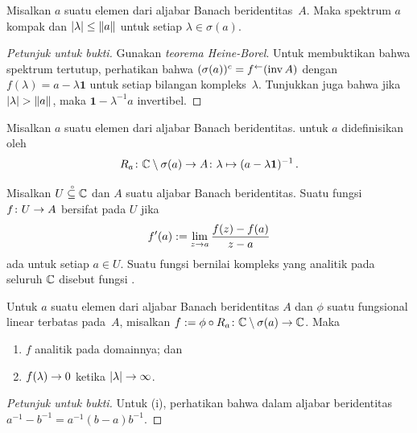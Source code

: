 \begin{prop}\label{000661} Misalkan $a$ suatu elemen dari aljabar Banach beridentitas~$A$. Maka spektrum $a$
kompak dan $\lvert\lambda\rvert \le \lVert a\rVert$ untuk setiap $\lambda \in \sigma(a)$.
\end{prop}

\begin{proof}[\emph{Petunjuk untuk bukti}] Gunakan \emph{teorema Heine-Borel}. Untuk membuktikan bahwa
spektrum tertutup, perhatikan bahwa $(\sigma(a))^c = f^\gets(\operatorname{inv} A)$ dengan $f(\lambda) = a -
\lambda\mathbf 1$ untuk setiap bilangan kompleks~$\lambda$. Tunjukkan juga bahwa jika $\lvert\lambda\rvert >
\lVert a\rVert$, maka $\mathbf 1 - \lambda^{-1}a$ invertibel.  \ns
\end{proof}

\begin{defn} Misalkan $a$ suatu elemen dari aljabar Banach beridentitas.
 untuk $a$ didefinisikan oleh
   \[ R_a \colon \mathbb{C} \setminus \sigma(a) \rightarrow A
                 \colon \lambda \mapsto (a  - \lambda\mathbf{1})^{-1}\,. \]
\end{defn}

\begin{defn} Misalkan $U\overset{\thickspace{}_\circ}{\subseteq}\mathbb{C}$ dan $A$ suatu aljabar Banach beridentitas. Suatu fungsi $f \colon U \rightarrow A$
bersifat  pada $U$ jika
   \[ f'(a) := \lim_{z \rightarrow a} \frac{f(z) - f(a)}{z - a} \]
ada untuk setiap $a \in U$. Suatu fungsi bernilai kompleks yang analitik pada seluruh $\mathbb{C}$
disebut fungsi
.
\end{defn}

\begin{prop} Untuk $a$ suatu elemen dari aljabar Banach beridentitas $A$ dan $\phi$ suatu fungsional linear
terbatas pada~$A$, misalkan $f := \phi \circ R_a \colon \mathbb{C} \setminus \sigma(a) \rightarrow \mathbb{C}$. Maka
 \begin{enumerate}[label=\rm{(\alph*)}]
  \item $f$ analitik pada domainnya; dan
  \item $f(\lambda) \rightarrow 0$ ketika $\lvert\lambda\rvert \rightarrow \infty$.
 \end{enumerate}
\end{prop}

\begin{proof}[\emph{Petunjuk untuk bukti}] Untuk (i), perhatikan bahwa dalam aljabar beridentitas $a^{-1} - b^{-1}
= a^{-1}(b - a)b^{-1}$.   \ns
\end{proof}

